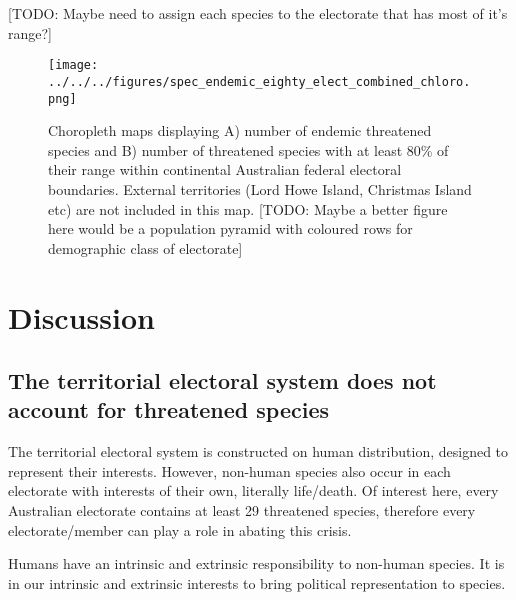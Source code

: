 \documentclass[a4paper,11pt]{article}
\begin{document}

[TODO: Maybe need to assign each species to the electorate that has most of it's range?]

\begin{figure}[H]
	\centering
    \texttt{[image: ../../../figures/spec\_endemic\_eighty\_elect\_combined\_chloro.png]}
    \caption{Choropleth maps displaying A) number of endemic threatened species and B) number of threatened species with at least 80\% of their range within continental Australian federal electoral boundaries. External territories (Lord Howe Island, Christmas Island etc) are not included in this map. [TODO: Maybe a better figure here would be a population pyramid with coloured rows for demographic class of electorate]}
    \label{fig:combined_chloro}
\end{figure}



\section{Discussion}


\subsection{The territorial electoral system does not account for threatened species}

The territorial electoral system is constructed on human distribution, designed to represent their interests. However, non-human species also occur in each electorate with interests of their own, literally life/death. Of interest here, every Australian electorate contains at least 29 threatened species, therefore every electorate/member can play a role in abating this crisis.

Humans have an intrinsic and extrinsic responsibility to non-human species. 
It is in our intrinsic and extrinsic interests to bring political representation to species.
\end{document}
